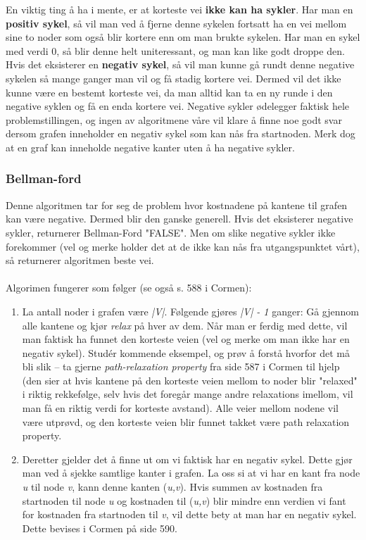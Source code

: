\noindent En viktig ting å ha i mente, er at korteste vei \textbf{ikke kan ha sykler}. Har man en \textbf{positiv sykel}, så vil man ved å fjerne denne sykelen fortsatt ha en vei mellom sine to noder som også blir kortere enn om man brukte sykelen. Har man en sykel med verdi 0, så blir denne helt uniteressant, og man kan like godt droppe den. Hvis det eksisterer en \textbf{negativ sykel}, så vil man kunne gå rundt denne negative sykelen så mange ganger man vil og få stadig kortere vei. Dermed vil det ikke kunne være en bestemt korteste vei, da man alltid kan ta en ny runde i den negative syklen og få en enda kortere vei. Negative sykler ødelegger faktisk hele problemstillingen, og ingen av algoritmene våre vil klare å finne noe godt svar dersom grafen inneholder en negativ sykel som kan nås fra startnoden. Merk dog at en graf kan inneholde negative kanter uten å ha negative sykler.

\subsubsection{Bellman-ford}
Denne algoritmen tar for seg de problem hvor kostnadene på kantene til grafen kan være negative. Dermed blir den ganske generell. Hvis det eksisterer negative sykler, returnerer Bellman-Ford "FALSE". Men om slike negative sykler ikke forekommer (vel og merke holder det at de ikke kan nås fra utgangspunktet vårt), så returnerer algoritmen beste vei.
\\\\
Algorimen fungerer som følger (se også s. 588 i Cormen):
\begin{enumerate}
    \item La antall noder i grafen være \textit{|V|}. Følgende gjøres \textit{|V| - 1} ganger: Gå gjennom alle kantene og kjør \textit{relax} på hver av dem. Når man er ferdig med dette, vil man faktisk ha funnet den korteste veien (vel og merke om man ikke har en negativ sykel). Studér kommende eksempel, og prøv å forstå hvorfor det må bli slik – ta gjerne \textit{path-relaxation property} fra side 587 i Cormen til hjelp (den sier at hvis kantene på den korteste veien mellom to  noder blir "relaxed" i riktig rekkefølge, selv hvis det foregår mange andre relaxations imellom, vil man få en riktig verdi for korteste avstand). Alle veier mellom nodene vil være utprøvd, og den korteste veien blir funnet takket være path relaxation property.
    \item Deretter gjelder det å finne ut om vi faktisk har en negativ sykel. Dette gjør man ved å sjekke samtlige kanter i grafen. La oss si at vi har en kant fra node \textit{u} til node \textit{v}, kann denne kanten (\textit{u,v}). Hvis summen av kostnaden fra startnoden til node \textit{u} og kostnaden til (\textit{u,v}) blir mindre enn verdien vi fant for kostnaden fra startnoden til \textit{v}, vil dette bety at man har en negativ sykel. Dette bevises i Cormen på side 590.
\end{enumerate}

